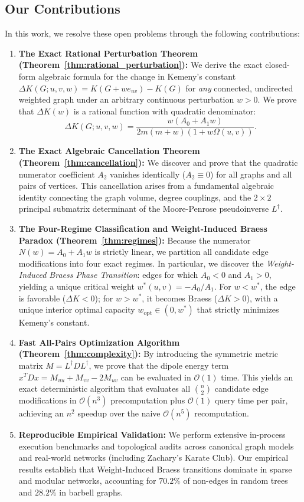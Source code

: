 \documentclass[11pt,a4paper]{article}
\theoremstyle{plain}
\theoremstyle{definition}
\begin{document}
\subsection{Our Contributions}
In this work, we resolve these open problems through the following contributions:
\begin{enumerate}
    \item \textbf{The Exact Rational Perturbation Theorem (Theorem~\ref{thm:rational_perturbation}):} We derive the exact closed-form algebraic formula for the change in Kemeny's constant $\Delta K(G; u, v, w) = K(G + w e_{uv}) - K(G)$ for \textit{any} connected, undirected weighted graph under an arbitrary continuous perturbation $w > 0$. We prove that $\Delta K(w)$ is a rational function with quadratic denominator:
    \begin{equation}
        \Delta K(G; u, v, w) = \frac{w (A_0 + A_1 w)}{2m(m + w)(1 + w \Omega(u, v))}.
    \end{equation}
    \item \textbf{The Exact Algebraic Cancellation Theorem (Theorem~\ref{thm:cancellation}):} We discover and prove that the quadratic numerator coefficient $A_2$ vanishes identically ($A_2 \equiv 0$) for all graphs and all pairs of vertices. This cancellation arises from a fundamental algebraic identity connecting the graph volume, degree couplings, and the $2 \times 2$ principal submatrix determinant of the Moore-Penrose pseudoinverse $L^\dagger$.
    \item \textbf{The Four-Regime Classification and Weight-Induced Braess Paradox (Theorem~\ref{thm:regimes}):} Because the numerator $N(w) = A_0 + A_1 w$ is strictly linear, we partition all candidate edge modifications into four exact regimes. In particular, we discover the \textit{Weight-Induced Braess Phase Transition}: edges for which $A_0 < 0$ and $A_1 > 0$, yielding a unique critical weight $w^*(u, v) = -A_0 / A_1$. For $w < w^*$, the edge is favorable ($\Delta K < 0$); for $w > w^*$, it becomes Braess ($\Delta K > 0$), with a unique interior optimal capacity $w_{\mathrm{opt}} \in (0, w^*)$ that strictly minimizes Kemeny's constant.
    \item \textbf{Fast All-Pairs Optimization Algorithm (Theorem~\ref{thm:complexity}):} By introducing the symmetric metric matrix $M = L^\dagger D L^\dagger$, we prove that the dipole energy term $x^T D x = M_{uu} + M_{vv} - 2 M_{uv}$ can be evaluated in $\mathcal{O}(1)$ time. This yields an exact deterministic algorithm that evaluates all $\binom{n}{2}$ candidate edge modifications in $\mathcal{O}(n^3)$ precomputation plus $\mathcal{O}(1)$ query time per pair, achieving an $n^2$ speedup over the naive $\mathcal{O}(n^5)$ recomputation.
    \item \textbf{Reproducible Empirical Validation:} We perform extensive in-process execution benchmarks and topological audits across canonical graph models and real-world networks (including Zachary's Karate Club). Our empirical results establish that Weight-Induced Braess transitions dominate in sparse and modular networks, accounting for $70.2\%$ of non-edges in random trees and $28.2\%$ in barbell graphs.
\end{enumerate}
\end{document}

